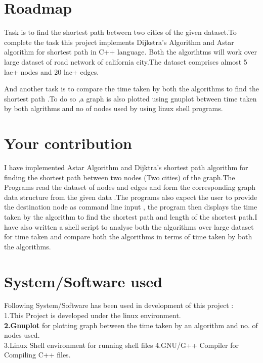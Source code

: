 \documentclass[14pt,a4]{extreport}
\begin{document}
\section{Roadmap}

Task is to find the shortest path between two cities of the given dataset.To complete the task this project implements Dijkstra's Algorithm and Astar algorithm for shortest path in C++ language.
Both the algorihtms will work over large dataset of road network of california city.The dataset comprises 
almost 5 lac+ nodes and 20 lac+ edges.

And another task is to compare the time taken by both the algorithms to find the shortest path .To do so ,a graph is also plotted using gnuplot between time taken by both algrithms and no of nodes used by using linux shell programs.

\section{Your contribution}
I have implemented Astar Algorithm and Dijktra's shortest path algorithm for finding the shortest path between two nodes (Two cities) of the graph.The Programs read the dataset of nodes and edges and form the corresponding graph data structure from the given data .The programs also expect the user to provide the destination node as command line input , the program then displays the time taken by the algorithm to find the shortest path and length of the shortest path.I have also written a shell script to analyse both the algorithms over large dataset for time taken and compare both the algorithms in terms of time taken by both the algorithms.
\section{System/Software used}
Following System/Software has been used in development of this project :\\
1.This Project is developed under the linux environment.\\
\textbf{2.Gnuplot} for plotting graph between the time taken by an algorithm and no. of nodes used.\\
3.Linux Shell environment for running shell files
4.GNU/G++ Compiler for Compiling C++ files.
\end{document}

